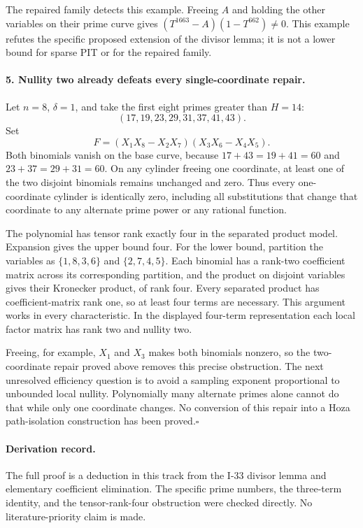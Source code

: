 The repaired family detects this example. Freeing $A$ and
holding the other variables on their prime curve gives
$(T^{1663}-A)(1-T^{662})\ne0$. This example refutes the
specific proposed extension of the divisor lemma; it is
not a lower bound for sparse PIT or for the repaired family.

\paragraph{5. Nullity two already defeats every single-coordinate repair.}
Let $n=8$, $\delta=1$, and take the first eight primes
greater than $H=14$:
\[
 (17,19,23,29,31,37,41,43).
\]
Set
\[
 F=(X_1X_8-X_2X_7)(X_3X_6-X_4X_5).
\]
Both binomials vanish on the base curve, because
$17+43=19+41=60$ and $23+37=29+31=60$.
On any cylinder freeing one coordinate, at least one of
the two disjoint binomials remains unchanged and zero.
Thus every one-coordinate cylinder is identically zero,
including all substitutions that change that coordinate
to any alternate prime power or any rational function.

The polynomial has tensor rank exactly four in the separated
product model. Expansion gives the upper bound four. For
the lower bound, partition the variables as
$\{1,8,3,6\}$ and $\{2,7,4,5\}$.
Each binomial has a rank-two coefficient matrix across its
corresponding partition, and the product on disjoint
variables gives their Kronecker product, of rank four.
Every separated product has coefficient-matrix rank one,
so at least four terms are necessary. This argument works
in every characteristic. In the displayed four-term
representation each local factor matrix has rank two and
nullity two.

Freeing, for example, $X_1$ and $X_3$ makes both binomials
nonzero, so the two-coordinate repair proved above removes
this precise obstruction. The next unresolved efficiency
question is to avoid a sampling exponent proportional to
unbounded local nullity. Polynomially many alternate primes
alone cannot do that while only one coordinate changes.
No conversion of this repair into a Hoza path-isolation
construction has been proved.\hfill$\square$

\paragraph{Derivation record.}
The full proof is a deduction in this track from the I-33
divisor lemma and elementary coefficient elimination.
The specific prime numbers, the three-term identity, and
the tensor-rank-four obstruction were checked directly.
No literature-priority claim is made.
